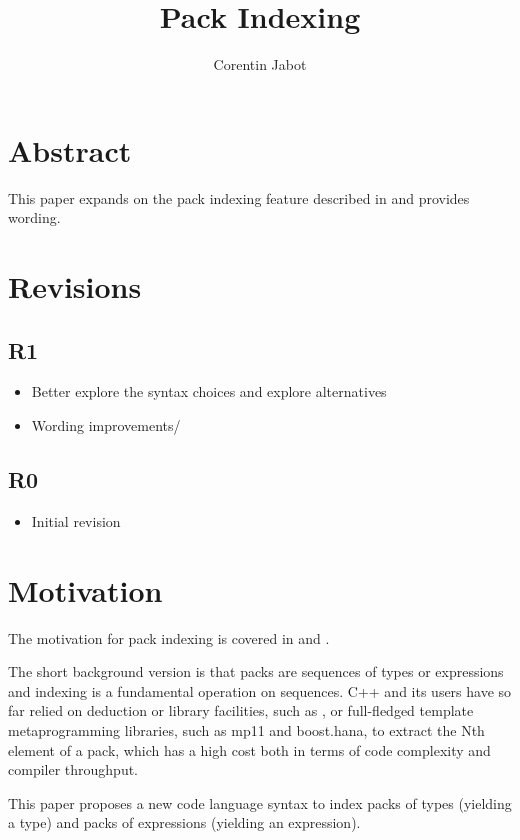 \documentclass{wg21}
\title{Pack Indexing}
\author{Corentin Jabot}{corentin.jabot@gmail.com}
\begin{document}
\maketitle

\section{Abstract}

This paper expands on the pack indexing feature described in  and provides wording.

\section{Revisions}


\subsection{R1}

\begin{itemize}
\item{Better explore the syntax choices and explore alternatives}
\item Wording improvements/
\end{itemize}

\subsection{R0}

\begin{itemize}
\item{Initial revision}
\end{itemize}

\section{Motivation}

The motivation for pack indexing is covered in  and
 .

The short background version is that packs are sequences of types or expressions
and indexing is a fundamental operation on sequences.
C++ and its users have so far relied on deduction or library facilities, such as , or full-fledged template metaprogramming libraries, such as
mp11 and boost.hana, to extract the Nth element of a pack, which has a high cost both in terms of code complexity and compiler throughput.

This paper proposes a new code language syntax to index packs of types (yielding a type) and packs of expressions (yielding an expression).
\end{document}
